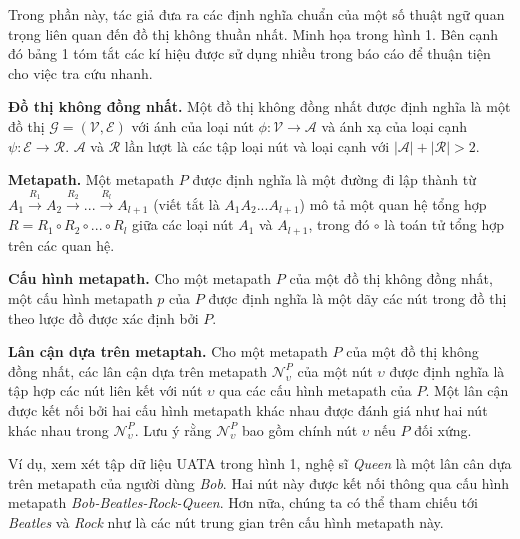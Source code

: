 Trong phần này, tác giả đưa ra các định nghĩa chuẩn của một số thuật ngữ quan trọng liên quan đến đồ thị không thuần nhất. Minh họa trong hình 1. Bên cạnh đó bảng 1 tóm tắt các kí hiệu được sử dụng nhiều trong báo cáo để thuận tiện cho việc tra cứu nhanh.

\begin{definition}
\textbf{Đồ thị không đồng nhất.} Một đồ thị không đồng nhất được định nghĩa là một đồ thị $\pmb{\mathcal{G}} = (\pmb{\mathcal{V}}, \pmb{\mathcal{E}})$ với ánh của loại nút $\phi: \pmb{\mathcal{V}} \to \pmb{\mathcal{A}}$ và ánh xạ của loại cạnh $\psi: \pmb{\mathcal{E}} \to \pmb{\mathcal{R}}$. $\pmb{\mathcal{A}}$ và $\pmb{\mathcal{R}}$ lần lượt là các tập loại nút và loại cạnh với $|\pmb{\mathcal{A}}| + |\pmb{\mathcal{R}}| > 2$.
\end{definition}

\begin{definition}
  \textbf{Metapath.} Một metapath $P$ được định nghĩa là một đường đi lập thành từ $A_1  \xrightarrow{R_1} A_2  \xrightarrow{R_2} ... \xrightarrow{R_l} A_{l+1}$ (viết tắt là $A_1 A_2 ... A_{l+1}$) mô tả một quan hệ tổng hợp $R = R_1 \circ R_2 \circ ... \circ R_l$ giữa các loại nút $A_1$ và $A_{l+1}$, trong đó $\circ$ là toán tử tổng hợp trên các quan hệ.
\end{definition}

\begin{definition}
  \textbf{Cấu hình metapath.} Cho một metapath $P$ của một đồ thị không đồng nhất, một cấu hình metapath $p$ của $P$ được định nghĩa là một dãy các nút trong đồ thị theo lược đồ được xác định bởi $P$.
\end{definition}

\begin{definition}
  \textbf{Lân cận dựa trên metaptah.} Cho một metapath $P$ của một đồ thị không đồng nhất, các lân cận dựa trên metapath $\pmb{\mathcal{N}}_\upsilon ^ P$ của một nút $\upsilon$ được định nghĩa là tập hợp các nút liên kết với nút $\upsilon$ qua các cấu hình metapath của $P$. Một lân cận được kết nối bởi hai cấu hình metapath khác nhau được đánh giá như hai nút khác nhau trong $\pmb{\mathcal{N}}_\upsilon ^ P$. Lưu ý rằng $\pmb{\mathcal{N}}_\upsilon ^ P$ bao gồm chính nút $\upsilon$ nếu $P$ đối xứng.

  Ví dụ, xem xét tập dữ liệu UATA trong hình 1, nghệ sĩ \textit{Queen} là một lân cân dựa trên metapath của người dùng \textit{Bob}. Hai nút này được kết nối thông qua cấu hình metapath \textit{Bob-Beatles-Rock-Queen}. Hơn nữa, chúng ta có thể tham chiếu tới \textit{Beatles} và \textit{Rock} như là các nút trung gian trên cấu hình metapath này.
\end{definition}


